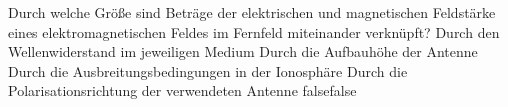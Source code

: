     {Durch welche Größe sind Beträge der elektrischen und magnetischen Feldstärke eines elektromagnetischen Feldes im Fernfeld miteinander verknüpft?}
    {Durch den Wellenwiderstand im jeweiligen Medium }
    {Durch die Aufbauhöhe der Antenne}
    {Durch die Ausbreitungsbedingungen in der Ionosphäre}
    {Durch die Polarisationsrichtung der verwendeten Antenne}
    {false}{false}